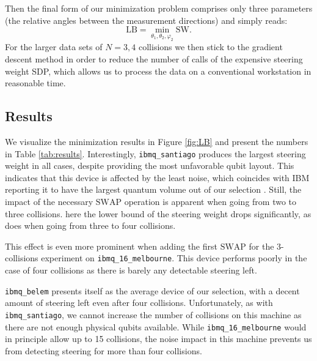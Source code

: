 \documentclass[aps,pra,twocolumn,superscriptaddress,showemail,showpacs,longbibliography]{revtex4-2}
\newcommand{\Op}[1]{\ensuremath{\mathrm{#1}}}
\begin{document}
Then the final form of our minimization problem comprises only three parameters 
(the relative angles between the measurement directions)
and simply reads:
\begin{equation}
    \Op{LB}= \min_{\theta_1, \theta_2, \varphi_2} \Op{SW}.
\end{equation}
For the larger data sets of $N=3,4$ collisions we then stick to the gradient descent method in order to reduce the number of calls of the expensive steering weight SDP, which allows us to process the data on a conventional workstation in reasonable time.


\subsection{Results}
We visualize the minimization results in Figure \ref{fig:LB} and present the numbers in Table \ref{tab:results}. Interestingly, \texttt{ibmq\_santiago} produces the largest steering weight in all cases, despite providing the most unfavorable qubit layout. This indicates that this device is affected by the least noise, which coincides with IBM reporting it to have the largest quantum volume out of our selection \cite{ibmq2021}. Still, the impact of the necessary \Op{SWAP} operation is apparent when going from two to three collisions. here the lower bound of the steering weight drops significantly, as does when going from three to four collisions. 

This effect is even more prominent when adding the first \Op{SWAP} for the 3-collisions experiment on \texttt{ibmq\_16\_melbourne}. This device performs poorly in the case of four collisions as there is barely any detectable steering left.

\texttt{ibmq\_belem} presents itself as the average device of our selection, with a decent amount of steering left even after four collisions. Unfortunately, as with \texttt{ibmq\_santiago}, we cannot increase the number of collisions on this machine as there are not enough physical qubits available. While \texttt{ibmq\_16\_melbourne} would in principle allow up to 15 collisions, the noise impact in this machine prevents us from detecting steering for more than four collisions.  
\end{document}
